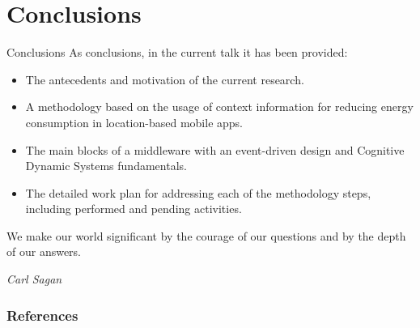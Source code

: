 \documentclass[10pt,xcolor={dvipsnames}]{beamer}
\begin{document}
\section{Conclusions}
\begin{frame}{Conclusions}{}
As conclusions, in the current talk it has been provided:
\begin{itemize}
  \item<+->  The antecedents and motivation of the current research.
  \item<+-> A methodology based on the usage of context information for reducing energy consumption in location-based mobile apps.
  \item<+-> The main blocks of a middleware with an event-driven design and Cognitive Dynamic Systems fundamentals.
  \item<+-> The detailed work plan for addressing each of the methodology steps, including performed and pending activities.
\end{itemize}
\end{frame}

{\aauwavesbg
\begin{frame}
  { \tiny
    \epigraph{\tiny We make our world significant by the courage of our questions and by the depth of our answers.}{\tiny \textit{Carl Sagan}}
  }
\end{frame}}

\begin{frame}[allowframebreaks]
        \frametitle{References}


\end{frame}
\end{document}
